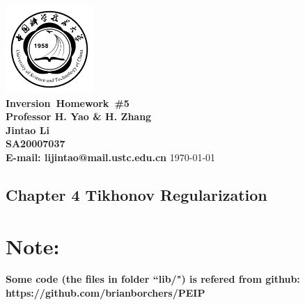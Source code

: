 \documentclass{article}
\makeatletter
\newcommand{\hmwkTitle}{Homework\ \#5}
\newcommand{\hmwkClass}{Inversion}
\newcommand{\hmwkClassInstructor}{Professor H. Yao \& H. Zhang}
\newcommand{\hmwkAuthorName}{\textbf{Jintao Li}}
\newcommand{\hmwkAuthorID}{\textbf{SA20007037}}
\newcommand{\hmwkAuthoremail}{\textbf{E-mail: lijintao@mail.ustc.edu.cn}}
\makeatother
\begin{document}
\begin{titlepage}

\begin{center}

\textcolor{ustcblue}{\includegraphics[width=0.25\textwidth]{./ustc_logo_fig.pdf} \\ [1cm]}
{ \Huge \bfseries \hmwkClass\ \hmwkTitle}\\[1cm]

\large \textbf{\hmwkClassInstructor} \\ [5cm]

\large \hmwkAuthorName \\ [0.25cm]
\large \hmwkAuthorID \\ [0.25cm]
\large \hmwkAuthoremail
\vfill
{\large \today}

\end{center}

\end{titlepage}

\begin{center}
\section{Chapter 4 Tikhonov Regularization}
\end{center}

\section{Note:}
\textbf{Some code (the files in folder ``lib/") is refered from github: https://github.com/brianborchers/PEIP}
\end{document}
